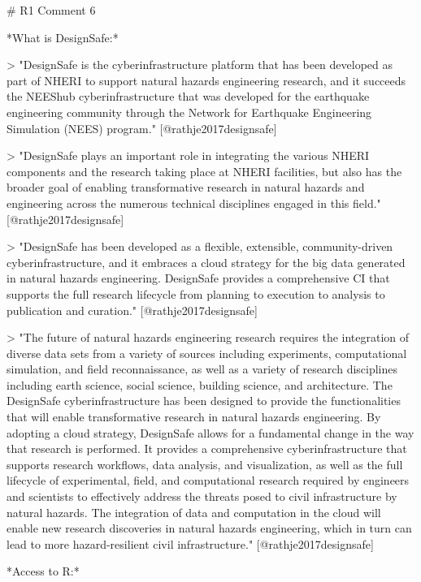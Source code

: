 # R1 Comment 6

*What is DesignSafe:*

> "DesignSafe is the cyberinfrastructure platform that has been developed as
part of NHERI to support natural hazards engineering research, and
it succeeds the NEEShub cyberinfrastructure that was developed for the
earthquake engineering community through the Network for Earthquake
Engineering Simulation (NEES) program." [@rathje2017designsafe]

> "DesignSafe plays an important role in integrating the various NHERI
components and the research taking place at NHERI facilities, but also has the
broader goal of enabling transformative research in natural hazards and
engineering across the numerous technical disciplines engaged in this field."
[@rathje2017designsafe]

> "DesignSafe has been developed as a flexible, extensible, community-driven
cyberinfrastructure, and it embraces a cloud strategy for the big data generated
in natural hazards engineering. DesignSafe provides a comprehensive CI that
supports the full research lifecycle from planning to execution to analysis to
publication and curation." [@rathje2017designsafe]


> "The future of natural hazards engineering research requires the integration
of diverse data sets from a variety of sources including experiments,
computational simulation, and field reconnaissance, as well as a variety of
research disciplines including earth science, social science, building science,
and architecture. The DesignSafe cyberinfrastructure has been designed to
provide the functionalities that will enable transformative research in natural
hazards engineering. By adopting a cloud strategy, DesignSafe allows for a
fundamental change in the way that research is performed. It provides a
comprehensive cyberinfrastructure that supports research workflows, data
analysis, and visualization, as well as the full lifecycle of experimental,
field, and computational research required by engineers and scientists to
effectively address the threats posed to civil infrastructure by natural
hazards. The integration of data and computation in the cloud will enable new
research discoveries in natural hazards engineering, which in turn can lead to
more hazard-resilient civil infrastructure." [@rathje2017designsafe]

*Access to R:*

